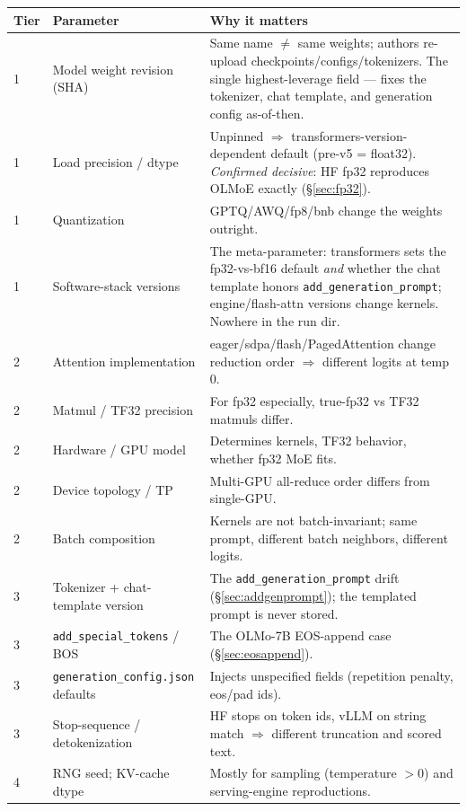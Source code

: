 \documentclass[11pt]{report}
\newcommand{\code}[1]{\texttt{#1}}
\begin{document}
\begin{longtable}{@{}p{}p{}p{}@{}}
\toprule
\textbf{Tier} & \textbf{Parameter} & \textbf{Why it matters} \\
\midrule
\endhead
1 & Model weight revision (SHA) & Same name $\ne$ same weights; authors re-upload
    checkpoints/configs/tokenizers. The single highest-leverage field --- fixes the
    tokenizer, chat template, and generation config as-of-then. \\
1 & Load precision / dtype & Unpinned $\Rightarrow$ transformers-version-dependent
    default (pre-v5 = float32). \emph{Confirmed decisive}: HF fp32 reproduces OLMoE
    exactly (\S\ref{sec:fp32}). \\
1 & Quantization & GPTQ/AWQ/fp8/bnb change the weights outright. \\
1 & Software-stack versions & The meta-parameter: transformers sets the fp32-vs-bf16
    default \emph{and} whether the chat template honors \code{add\_generation\_prompt};
    engine/flash-attn versions change kernels. Nowhere in the run dir. \\
\midrule
2 & Attention implementation & eager/sdpa/flash/PagedAttention change reduction order
    $\Rightarrow$ different logits at temp 0. \\
2 & Matmul / TF32 precision & For fp32 especially, true-fp32 vs TF32 matmuls differ. \\
2 & Hardware / GPU model & Determines kernels, TF32 behavior, whether fp32 MoE fits. \\
2 & Device topology / TP & Multi-GPU all-reduce order differs from single-GPU. \\
2 & Batch composition & Kernels are not batch-invariant; same prompt, different
    batch neighbors, different logits. \\
\midrule
3 & Tokenizer + chat-template version & The \code{add\_generation\_prompt} drift
    (\S\ref{sec:addgenprompt}); the templated prompt is never stored. \\
3 & \code{add\_special\_tokens} / BOS & The OLMo-7B EOS-append case
    (\S\ref{sec:eosappend}). \\
3 & \code{generation\_config.json} defaults & Injects unspecified fields
    (repetition penalty, eos/pad ids). \\
3 & Stop-sequence / detokenization & HF stops on token ids, vLLM on string match
    $\Rightarrow$ different truncation and scored text. \\
\midrule
4 & RNG seed; KV-cache dtype & Mostly for sampling (temperature $>0$) and
    serving-engine reproductions. \\
\bottomrule
\end{longtable}
\end{document}
